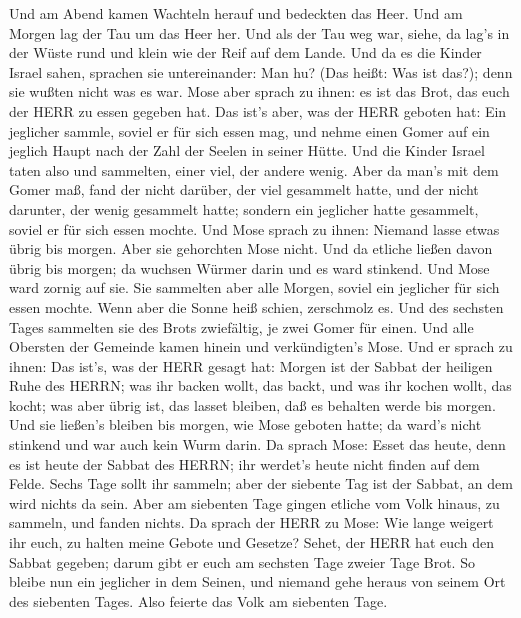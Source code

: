  Und am Abend kamen Wachteln herauf und bedeckten das Heer.
Und am Morgen lag der Tau um das Heer her.  Und als der Tau
weg war, siehe, da lag's in der Wüste rund und klein wie der Reif auf
dem Lande.  Und da es die Kinder Israel sahen, sprachen sie
untereinander: Man hu? (Das heißt: Was ist das?); denn sie wußten nicht
was es war. Mose aber sprach zu ihnen: es ist das Brot, das euch der
HERR zu essen gegeben hat.  Das ist's aber, was der HERR
geboten hat: Ein jeglicher sammle, soviel er für sich essen mag, und
nehme einen Gomer auf ein jeglich Haupt nach der Zahl der Seelen in
seiner Hütte.  Und die Kinder Israel taten also und
sammelten, einer viel, der andere wenig.  Aber da man's mit
dem Gomer maß, fand der nicht darüber, der viel gesammelt hatte, und der
nicht darunter, der wenig gesammelt hatte; sondern ein jeglicher hatte
gesammelt, soviel er für sich essen mochte.  Und Mose
sprach zu ihnen: Niemand lasse etwas übrig bis morgen. 
Aber sie gehorchten Mose nicht. Und da etliche ließen davon übrig bis
morgen; da wuchsen Würmer darin und es ward stinkend. Und Mose ward
zornig auf sie.  Sie sammelten aber alle Morgen, soviel ein
jeglicher für sich essen mochte. Wenn aber die Sonne heiß schien,
zerschmolz es.  Und des sechsten Tages sammelten sie des
Brots zwiefältig, je zwei Gomer für einen. Und alle Obersten der
Gemeinde kamen hinein und verkündigten's Mose.  Und er
sprach zu ihnen: Das ist's, was der HERR gesagt hat: Morgen ist der
Sabbat der heiligen Ruhe des HERRN; was ihr backen wollt, das backt, und
was ihr kochen wollt, das kocht; was aber übrig ist, das lasset bleiben,
daß es behalten werde bis morgen.  Und sie ließen's bleiben
bis morgen, wie Mose geboten hatte; da ward's nicht stinkend und war
auch kein Wurm darin.  Da sprach Mose: Esset das heute,
denn es ist heute der Sabbat des HERRN; ihr werdet's heute nicht finden
auf dem Felde.  Sechs Tage sollt ihr sammeln; aber der
siebente Tag ist der Sabbat, an dem wird nichts da sein. 
Aber am siebenten Tage gingen etliche vom Volk hinaus, zu sammeln, und
fanden nichts.  Da sprach der HERR zu Mose: Wie lange
weigert ihr euch, zu halten meine Gebote und Gesetze? 
Sehet, der HERR hat euch den Sabbat gegeben; darum gibt er euch am
sechsten Tage zweier Tage Brot. So bleibe nun ein jeglicher in dem
Seinen, und niemand gehe heraus von seinem Ort des siebenten Tages.
 Also feierte das Volk am siebenten Tage.

